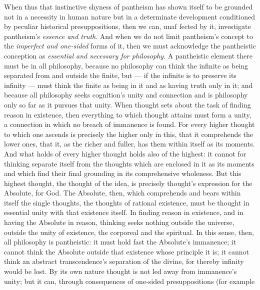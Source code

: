 \documentclass[12pt,a4paper]{book}
\begin{document}
When thus that instinctive shyness of pantheism has shown itself to be
grounded not in a necessity in human nature but in a determinate development
conditioned by peculiar historical presuppositions, then we can, unaf\-%
fected by it, investigate pantheism's \emph{essence and truth}. And when we do
not limit pantheism's concept to the \emph{imperfect and one-sided} forms of
it, then we must acknowledge the pantheistic conception as \emph{essential and
necessary for philosophy}. A pantheistic element there must be in all
philosophy, because no philosophy can think the infinite as being separated
from and outside the finite, but --- if the infinite is to preserve its
infinity --- must think the finite as being in it and as having truth only in
it; and because all philosophy seeks cognition's unity and connection and is
philosophy only so far as it pursues that unity. When thought sets about the
task of finding reason in existence, then everything to which thought attains
must form a unity, a connection in which no breach of immanence is found. For
every higher thought to which one ascends is precisely the higher only in
this, that it comprehends the lower ones, that it, as the richer and fuller,
has them within itself as its moments. And what holds of every higher thought
holds also of the highest: it cannot for thinking separate itself from the
thoughts which are enclosed in it as its moments and which find their final
grounding in its comprehensive wholeness. But this highest thought, the
thought of the idea, is precisely thought's expression for the Absolute, for
God. The Absolute, then, which comprehends and bears within itself the single
thoughts, the thoughts of rational existence, must be thought in essential
unity with that existence itself. In finding reason in existence, and in
having the Absolute in reason, thinking seeks nothing outside the universe,
outside the unity of existence, the corporeal and the spiritual. In this sense,
then, all philosophy is pantheistic: it must hold fast the Absolute's
immanence; it cannot think the Absolute outside that existence whose principle
it is; it cannot think an abstract transcendence's separation of the divine,
for thereby infinity would be lost. By its own nature thought is not led away
from immanence's unity; but it can, through consequences of one-sided
presuppositions (for example
\end{document}
